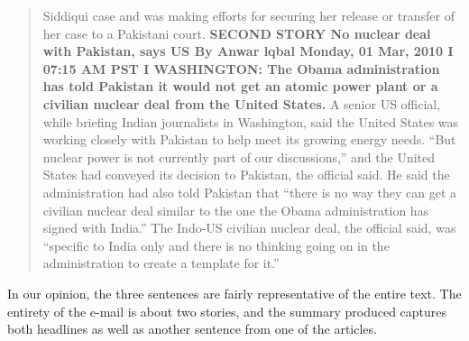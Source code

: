 \begin{quotation}
Siddiqui case and was making efforts for securing her release or transfer of her case to a Pakistani court.
\textbf{SECOND STORY
No nuclear deal with Pakistan, says US
By Anwar lqbal
Monday, 01 Mar, 2010 I 07:15 AM PST I
WASHINGTON: The Obama administration has told Pakistan it would not get an atomic power plant or a civilian nuclear
deal from the United States.}
A senior US official, while briefing Indian journalists in Washington, said the United States was working closely with
Pakistan to help meet its growing energy needs.
``But nuclear power is not currently part of our discussions,'' and the United States had conveyed its decision to Pakistan,
the official said.
He said the administration had also told Pakistan that ``there is no way they can get a civilian nuclear deal similar to the
one the Obama administration has signed with India.''
The Indo-US civilian nuclear deal, the official said, was ``specific to India only and there is no thinking going on in the
administration to create a template for it.''
\end{quotation}

In our opinion, the three sentences are fairly representative of the entire text.
The entirety of the e-mail is about two stories, and the summary produced captures both headlines as well as another sentence from one of the articles.